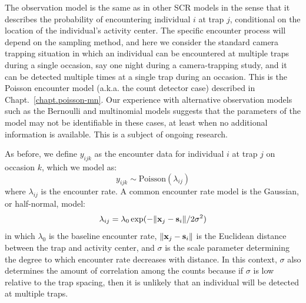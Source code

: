 The observation model is the same as in other SCR models %
in the sense that it describes the probability of encountering individual
$i$ at trap $j$, conditional on the location of the individual's
activity center. The specific encounter process will depend on the
sampling method, and here we consider the standard camera trapping
situation in which an individual can be encountered at multiple traps
during a single occasion, say one night during a camera-trapping
study, and it can be detected multiple times at a single trap during
an occasion. This is the Poisson encounter model (a.k.a. the count
detector case) 
described in Chapt.~\ref{chapt.poisson-mn}. Our
experience with alternative observation models such as the
Bernoulli and multinomial models
suggests that the parameters of the model may not be identifiable in
these cases, %
at least
when no additional information is available. This is a subject of
ongoing research.

As before, we define $y_{ijk}$ as the
encounter data for individual $i$ at trap $j$ on occasion $k$, which
we model as:
\begin{equation}
 y_{ijk} \sim \mbox{Poisson}(\lambda_{ij})
\label{eq.latentPoisson}
\end{equation}
where $\lambda_{ij}$ is the encounter rate. A common encounter rate model is the
Gaussian, or half-normal, model:
\[
\lambda_{ij} = \lambda_0 \exp( - \| {\bf x}_j - {\bf s}_i \| / 2\sigma^2)
\]
in which $\lambda_0$ is the baseline encounter rate,
$\| {\bf x}_j - {\bf s}_i \|$ is the Euclidean distance between the
trap and activity center, and $\sigma$ is the
scale parameter determining the degree to which encounter rate decreases with
distance. In this context, $\sigma$ also determines the amount of
correlation among the counts because if $\sigma$ is low relative to
the trap spacing, then it is unlikely that an individual will be
detected at multiple traps.


